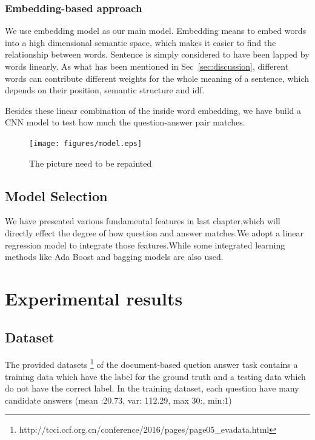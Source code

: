 \documentclass{llncs}
\begin{document}
\subsubsection{Embedding-based approach}
\label{sec:embedding}
We use embedding model as our main model. Embedding means to embed words into a high dimensional semantic space, which makes it easier to find the relationship between words. Sentence is simply considered to have been lapped by words linearly. As what has been mentioned in Sec~\ref{sec:discussion}, different words can contribute different weights for the whole meaning of a sentence, which depends on their position, semantic structure and idf. 

Besides these linear combination of the inside word embedding, we have build a CNN model to test how much the question-answer pair matches. 
\begin{figure}
\centering
\texttt{[image: figures/model.eps]}
\caption{ The picture need to be repainted}
\label{fig:model}
\end{figure}



\subsection{Model Selection}
\label{sec:model}

We have presented various fundamental features in last chapter,which will directly effect the degree of how question and answer matches.We adopt a linear regression model to integrate those features.While some integrated learning methods like Ada Boost and bagging models are also used. 


\section{Experimental results}


\subsection{Dataset}

The provided datasets \footnote{ http://tcci.ccf.org.cn/conference/2016/pages/page05\_evadata.html} of the document-based quetion answer task contains a training data which have the label for the ground truth and a testing data which do not have the correct label.  In the training dataset, each question have many candidate answers (mean :20.73, var: 112.29, max 30:, min:1) 
\end{document}
